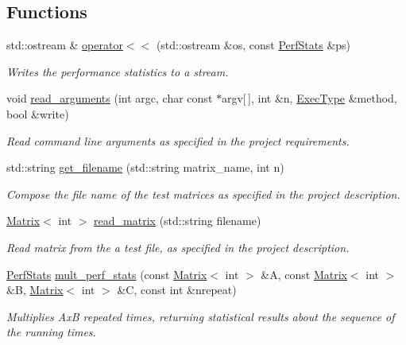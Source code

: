 \subsection*{Functions}
\begin{DoxyCompactItemize}
\item 
std\+::ostream \& \mbox{\hyperlink{namespaceMatTestUtils_a8d3fb72c1d83eeaef63f6255186d26c6}{operator$<$$<$}} (std\+::ostream \&os, const \mbox{\hyperlink{structMatTestUtils_1_1PerfStats}{Perf\+Stats}} \&ps)
\begin{DoxyCompactList}\small\item\em Writes the performance statistics to a stream. \end{DoxyCompactList}\item 
void \mbox{\hyperlink{namespaceMatTestUtils_affa961d32d7a7eb7addab0a07767f14f}{read\+\_\+arguments}} (int argc, char const $\ast$argv\mbox{[}$\,$\mbox{]}, int \&n, \mbox{\hyperlink{namespaceMatTestUtils_a8ce892071d861e65dd62ef377efaaa6b}{Exec\+Type}} \&method, bool \&write)
\begin{DoxyCompactList}\small\item\em Read command line arguments as specified in the project requirements. \end{DoxyCompactList}\item 
std\+::string \mbox{\hyperlink{namespaceMatTestUtils_a9e032c504f598952db985df790a0bcaa}{get\+\_\+filename}} (std\+::string matrix\+\_\+name, int n)
\begin{DoxyCompactList}\small\item\em Compose the file name of the test matrices as specified in the project description. \end{DoxyCompactList}\item 
\mbox{\hyperlink{classMatrix}{Matrix}}$<$ int $>$ \mbox{\hyperlink{namespaceMatTestUtils_ac9fd0d2adf3b7cf8557c67e8874ba878}{read\+\_\+matrix}} (std\+::string filename)
\begin{DoxyCompactList}\small\item\em Read matrix from the a test file, as specified in the project description. \end{DoxyCompactList}\item 
\mbox{\hyperlink{structMatTestUtils_1_1PerfStats}{Perf\+Stats}} \mbox{\hyperlink{namespaceMatTestUtils_a2d2c2d9b072496ad809920b09ecf4b45}{mult\+\_\+perf\+\_\+stats}} (const \mbox{\hyperlink{classMatrix}{Matrix}}$<$ int $>$ \&A, const \mbox{\hyperlink{classMatrix}{Matrix}}$<$ int $>$ \&B, \mbox{\hyperlink{classMatrix}{Matrix}}$<$ int $>$ \&C, const int \&nrepeat)
\begin{DoxyCompactList}\small\item\em Multiplies AxB repeated times, returning statistical results about the sequence of the running times. \end{DoxyCompactList}\end{DoxyCompactItemize}
